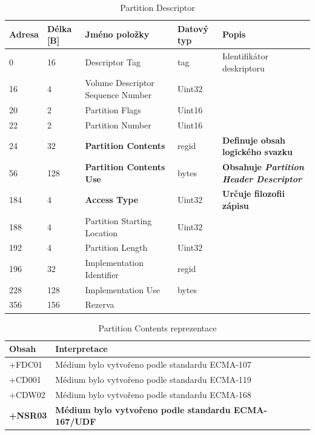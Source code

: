 \begin{table}[]
    \centering
    \begin{tabular}{ | l | l | p{4.2cm} | p{1.8cm} | p{5.5cm} | }
        \hline
        Adresa  & Délka [B]   & Jméno položky & Datový typ    & Popis \\ \hline\hline
        0   &16     & Descriptor Tag                    & tag           & Identifikátor deskriptoru \\ \hline
        16  &4      &Volume Descriptor Sequence Number  & Uint32        & \\ \hline
        20  &2      &Partition Flags                    & Uint16        & \\ \hline
        22  &2      &Partition Number                   & Uint16        & \\ \hline
        24  &32     &\textbf{Partition Contents}        & regid         & \textbf{Definuje obsah logického svazku} \\ \hline
        56  &128    &\textbf{Partition Contents Use}    & bytes         & \textbf{Obsahuje \textit{Partition Header Descriptor}} \\ \hline
        184 &4      &\textbf{Access Type}               & Uint32        & \textbf{Určuje filozofii zápisu} \\ \hline
        188 &4      &Partition Starting Location        & Uint32        & \\ \hline
        192 &4      &Partition Length                   & Uint32        & \\ \hline
        196 &32     &Implementation Identifier          & regid         & \\ \hline
        228 &128    &Implementation Use                 & bytes         & \\ \hline
        356 &156    &Rezerva                            &               & \\ \hline 
    \end{tabular}
    \caption{Partition Descriptor\label{tab:pd}}
\end{table}
\begin{table}
    \centering
    \begin{tabular}{| l | l |}
        \hline
        Obsah & Interpretace \\ \hline\hline
        +FDC01& Médium bylo vytvořeno podle standardu ECMA-107 \\ \hline
        +CD001& Médium bylo vytvořeno podle standardu ECMA-119\\ \hline
        +CDW02& Médium bylo vytvořeno podle standardu ECMA-168\\ \hline
        \textbf{+NSR03}& \textbf{Médium bylo vytvořeno podle standardu ECMA-167/UDF}\\ \hline
    \end{tabular}
    \caption{Partition Contents reprezentace\label{tab:pd-partition-contents}}
\end{table}
